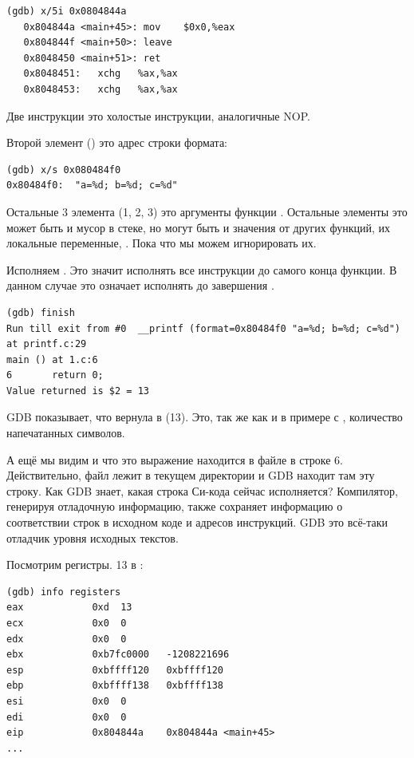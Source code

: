 \begin{lstlisting}[label=NOP_as_XCHG_example]
(gdb) x/5i 0x0804844a
   0x804844a <main+45>:	mov    $0x0,%eax
   0x804844f <main+50>:	leave  
   0x8048450 <main+51>:	ret    
   0x8048451:	xchg   %ax,%ax
   0x8048453:	xchg   %ax,%ax
\end{lstlisting}

Две инструкции  это холостые инструкции, аналогичные \ac{NOP}.

Второй элемент () это адрес строки формата:

\begin{lstlisting}
(gdb) x/s 0x080484f0
0x80484f0:	"a=%d; b=%d; c=%d"
\end{lstlisting}

Остальные 3 элемента (1, 2, 3) это аргументы функции \printf.
Остальные элементы это может быть и мусор в стеке, но могут быть и значения
от других функций, их локальные переменные, \etc{}.
Пока что мы можем игнорировать их.

Исполняем . 
Это значит исполнять все инструкции до самого конца функции. 
В данном случае это означает исполнять до завершения \printf.

\begin{lstlisting}
(gdb) finish
Run till exit from #0  __printf (format=0x80484f0 "a=%d; b=%d; c=%d") at printf.c:29
main () at 1.c:6
6		return 0;
Value returned is $2 = 13
\end{lstlisting}

\ac{GDB} показывает, что вернула \printf в \EAX (13).
Это, так же как и в примере с \olly, количество напечатанных символов.

А ещё мы видим  и что это выражение находится в файле  в строке 6.
Действительно, файл  лежит в текущем директории и \ac{GDB} находит там эту строку.
Как \ac{GDB} знает, какая строка Си-кода сейчас исполняется?
Компилятор, генерируя отладочную информацию, также сохраняет информацию о соответствии строк в исходном коде и адресов инструкций.
GDB это всё-таки отладчик уровня исходных текстов.

Посмотрим регистры.
13 в \EAX:

\begin{lstlisting}
(gdb) info registers
eax            0xd	13
ecx            0x0	0
edx            0x0	0
ebx            0xb7fc0000	-1208221696
esp            0xbffff120	0xbffff120
ebp            0xbffff138	0xbffff138
esi            0x0	0
edi            0x0	0
eip            0x804844a	0x804844a <main+45>
...
\end{lstlisting}

